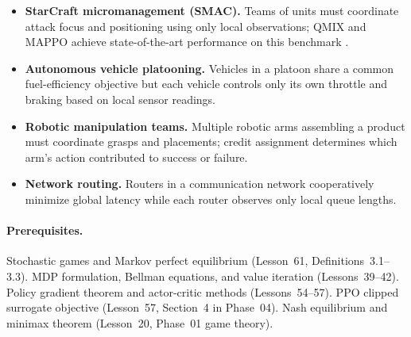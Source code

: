 \documentclass[11pt,a4paper]{article}
\begin{document}
\begin{rlconnection}[title={Why Cooperative MARL Matters}]
\begin{itemize}[nosep]
  \item \textbf{StarCraft micromanagement (SMAC).}  Teams of units
    must coordinate attack focus and positioning using only local
    observations; QMIX and MAPPO achieve state-of-the-art performance
    on this benchmark \citep{samvelyan2019}.
  \item \textbf{Autonomous vehicle platooning.}  Vehicles in a platoon
    share a common fuel-efficiency objective but each vehicle controls
    only its own throttle and braking based on local sensor readings.
  \item \textbf{Robotic manipulation teams.}  Multiple robotic arms
    assembling a product must coordinate grasps and placements;
    credit assignment determines which arm's action contributed to
    success or failure.
  \item \textbf{Network routing.}  Routers in a communication network
    cooperatively minimize global latency while each router observes
    only local queue lengths.
\end{itemize}
\end{rlconnection}

\paragraph{Prerequisites.}
Stochastic games and Markov perfect equilibrium (Lesson~61,
Definitions~3.1--3.3).  MDP formulation, Bellman equations, and
value iteration (Lessons~39--42).  Policy gradient theorem and
actor-critic methods (Lessons~54--57).  PPO clipped surrogate
objective (Lesson~57, Section~4 in Phase~04).  Nash equilibrium
and minimax theorem (Lesson~20, Phase~01 game theory).
\end{document}
